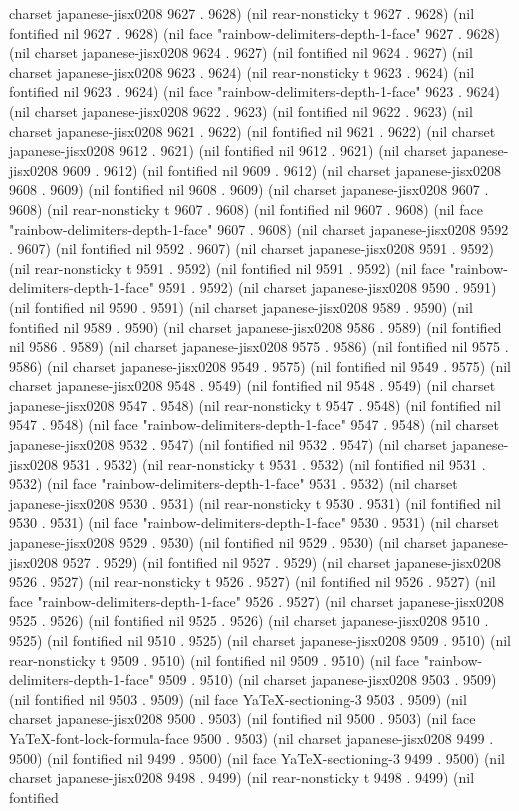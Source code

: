 charset japanese-jisx0208 9627 . 9628) (nil rear-nonsticky t 9627 . 9628) (nil fontified nil 9627 . 9628) (nil face "rainbow-delimiters-depth-1-face" 9627 . 9628) (nil charset japanese-jisx0208 9624 . 9627) (nil fontified nil 9624 . 9627) (nil charset japanese-jisx0208 9623 . 9624) (nil rear-nonsticky t 9623 . 9624) (nil fontified nil 9623 . 9624) (nil face "rainbow-delimiters-depth-1-face" 9623 . 9624) (nil charset japanese-jisx0208 9622 . 9623) (nil fontified nil 9622 . 9623) (nil charset japanese-jisx0208 9621 . 9622) (nil fontified nil 9621 . 9622) (nil charset japanese-jisx0208 9612 . 9621) (nil fontified nil 9612 . 9621) (nil charset japanese-jisx0208 9609 . 9612) (nil fontified nil 9609 . 9612) (nil charset japanese-jisx0208 9608 . 9609) (nil fontified nil 9608 . 9609) (nil charset japanese-jisx0208 9607 . 9608) (nil rear-nonsticky t 9607 . 9608) (nil fontified nil 9607 . 9608) (nil face "rainbow-delimiters-depth-1-face" 9607 . 9608) (nil charset japanese-jisx0208 9592 . 9607) (nil fontified nil 9592 . 9607) (nil charset japanese-jisx0208 9591 . 9592) (nil rear-nonsticky t 9591 . 9592) (nil fontified nil 9591 . 9592) (nil face "rainbow-delimiters-depth-1-face" 9591 . 9592) (nil charset japanese-jisx0208 9590 . 9591) (nil fontified nil 9590 . 9591) (nil charset japanese-jisx0208 9589 . 9590) (nil fontified nil 9589 . 9590) (nil charset japanese-jisx0208 9586 . 9589) (nil fontified nil 9586 . 9589) (nil charset japanese-jisx0208 9575 . 9586) (nil fontified nil 9575 . 9586) (nil charset japanese-jisx0208 9549 . 9575) (nil fontified nil 9549 . 9575) (nil charset japanese-jisx0208 9548 . 9549) (nil fontified nil 9548 . 9549) (nil charset japanese-jisx0208 9547 . 9548) (nil rear-nonsticky t 9547 . 9548) (nil fontified nil 9547 . 9548) (nil face "rainbow-delimiters-depth-1-face" 9547 . 9548) (nil charset japanese-jisx0208 9532 . 9547) (nil fontified nil 9532 . 9547) (nil charset japanese-jisx0208 9531 . 9532) (nil rear-nonsticky t 9531 . 9532) (nil fontified nil 9531 . 9532) (nil face "rainbow-delimiters-depth-1-face" 9531 . 9532) (nil charset japanese-jisx0208 9530 . 9531) (nil rear-nonsticky t 9530 . 9531) (nil fontified nil 9530 . 9531) (nil face "rainbow-delimiters-depth-1-face" 9530 . 9531) (nil charset japanese-jisx0208 9529 . 9530) (nil fontified nil 9529 . 9530) (nil charset japanese-jisx0208 9527 . 9529) (nil fontified nil 9527 . 9529) (nil charset japanese-jisx0208 9526 . 9527) (nil rear-nonsticky t 9526 . 9527) (nil fontified nil 9526 . 9527) (nil face "rainbow-delimiters-depth-1-face" 9526 . 9527) (nil charset japanese-jisx0208 9525 . 9526) (nil fontified nil 9525 . 9526) (nil charset japanese-jisx0208 9510 . 9525) (nil fontified nil 9510 . 9525) (nil charset japanese-jisx0208 9509 . 9510) (nil rear-nonsticky t 9509 . 9510) (nil fontified nil 9509 . 9510) (nil face "rainbow-delimiters-depth-1-face" 9509 . 9510) (nil charset japanese-jisx0208 9503 . 9509) (nil fontified nil 9503 . 9509) (nil face YaTeX-sectioning-3 9503 . 9509) (nil charset japanese-jisx0208 9500 . 9503) (nil fontified nil 9500 . 9503) (nil face YaTeX-font-lock-formula-face 9500 . 9503) (nil charset japanese-jisx0208 9499 . 9500) (nil fontified nil 9499 . 9500) (nil face YaTeX-sectioning-3 9499 . 9500) (nil charset japanese-jisx0208 9498 . 9499) (nil rear-nonsticky t 9498 . 9499) (nil fontified 